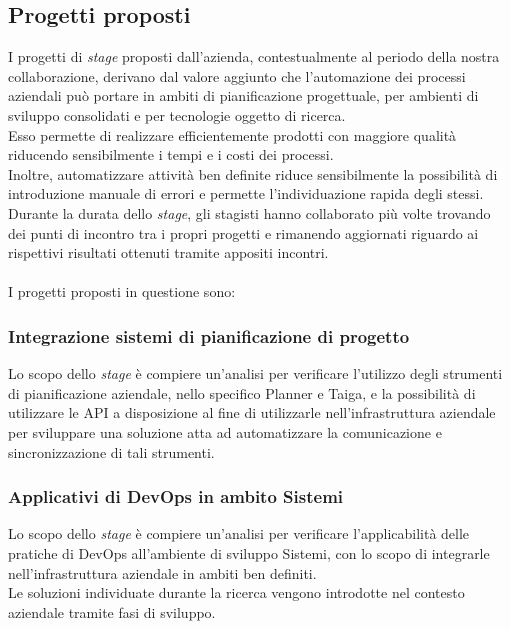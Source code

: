 \subsection{Progetti proposti}
I progetti di \emph{stage} proposti dall'azienda, contestualmente al periodo della nostra collaborazione, derivano dal valore aggiunto che l'automazione dei processi aziendali può portare in ambiti di pianificazione progettuale, per ambienti di sviluppo consolidati e per tecnologie oggetto di ricerca.\\
Esso permette di realizzare efficientemente prodotti con maggiore qualità riducendo sensibilmente i tempi e i costi dei processi.\\
Inoltre, automatizzare attività ben definite riduce sensibilmente la possibilità di introduzione manuale di errori e permette l'individuazione rapida degli stessi.\\
Durante la durata dello \emph{stage}, gli stagisti hanno collaborato più volte trovando dei punti di incontro tra i propri progetti e rimanendo aggiornati riguardo ai rispettivi risultati ottenuti tramite appositi incontri.\\\\
I progetti proposti in questione sono: 

\subsubsection*{Integrazione sistemi di pianificazione di progetto}
Lo scopo dello \emph{stage} è compiere un'analisi per verificare l'utilizzo degli strumenti di pianificazione aziendale, nello specifico Planner e Taiga, e la possibilità di utilizzare le \gls{API} a disposizione al fine di utilizzarle nell'infrastruttura aziendale per sviluppare una soluzione atta ad automatizzare la comunicazione e sincronizzazione di tali strumenti.

\subsubsection*{Applicativi di \gls{DevOps} in ambito Sistemi}
Lo scopo dello \emph{stage} è compiere un'analisi per verificare l'applicabilità delle pratiche di \gls{DevOps} all'ambiente di sviluppo \gls{Sistemi}, con lo scopo di integrarle nell'infrastruttura aziendale in ambiti ben definiti.\\
Le soluzioni individuate durante la ricerca vengono introdotte nel contesto aziendale tramite fasi di sviluppo. 
 

